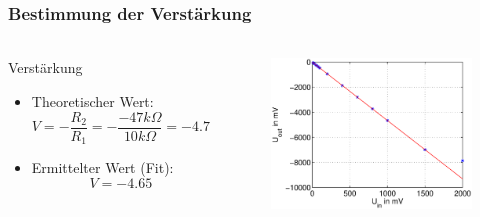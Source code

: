 \begin{frame}
\frametitle{Bestimmung der Verstärkung}
\framesubtitle{}
    \begin{columns}[c]
        \begin{block}{Verstärkung}
            \begin{itemize}
                \item Theoretischer Wert:
                    \begin{equation*}
                        V=-\frac{R_2}{R_1} = -\frac{-47k\Omega}{10k\Omega}=-4.7
                    \end{equation*}
                \item Ermittelter Wert (Fit):
                    \begin{equation*}
                        V=-4.65    
                    \end{equation*}
            \end{itemize}
        \end{block}
        \begin{figure}[H]
        \begin{center}
                \includegraphics[scale=0.35]{./img/plots/Auf_2_Uout_Uin.eps}
        \end{center}
        \end{figure}
    \end{columns}
\end{frame}

